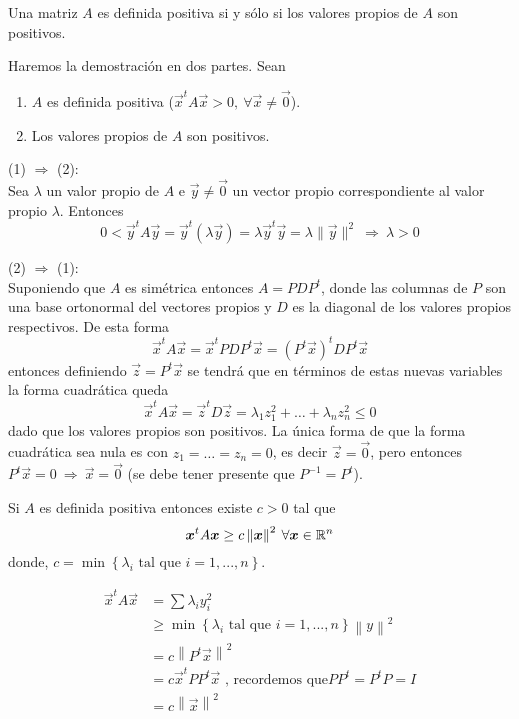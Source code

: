 \begin{teorema}
Una matriz $A$ es definida positiva si y s\'olo si los valores propios de $A$
son positivos.
\end{teorema}

\begin{demostracion}
Haremos la demostraci\'on en dos partes. Sean
\begin{enumerate}
\item $A$ es definida positiva ($\vec{x}^tA\vec{x} >0,\:\forall \vec{x}\neq \vec{0}$).
\item Los valores propios de $A$ son positivos.
\end{enumerate}

(1) $\Rightarrow$ (2):
\\Sea $\lambda$ un valor propio de $A$ e $\vec{y}\neq \vec{0}$ un vector propio correspondiente al valor propio $\lambda$. Entonces
$$0<\vec{y}^tA\vec{y}=\vec{y}^t(\lambda \vec{y})=\lambda \vec{y}^t\vec{y}=\lambda \|\vec{y}\|^2 \:\Rightarrow\: \lambda > 0$$

(2) $\Rightarrow$ (1):
\\Suponiendo que $A$ es sim\'etrica entonces $A=PDP^t$, donde las columnas de $P$ son una base ortonormal del vectores propios y $D$ es la diagonal de los valores propios respectivos. De esta forma
$$\vec{x}^tA\vec{x}=\vec{x}^tPDP^t\vec{x}=(P^t\vec{x})^tDP^t\vec{x}$$
entonces definiendo $\vec{z}=P^t\vec{x}$ se tendr\'a que en t\'erminos de estas nuevas variables la forma cuadr\'atica queda
$$\vec{x}^tA\vec{x}=\vec{z}^tD\vec{z}=\lambda_1z_1^2 + \ldots + \lambda_nz_n^2 \leq 0$$
dado que los valores propios son positivos. La \'unica forma de que la forma cuadr\'atica sea nula es con $z_1=\ldots=z_n=0$, es decir $\vec{z}=\vec{0}$, pero entonces $P^t\vec{x}=0 \:\Rightarrow\: \vec{x}=\vec{0}$ (se debe tener presente que $P^{-1}=P^t$).
\end{demostracion}

\begin{corolario}
Si $A$ es definida positiva entonces existe $c>0$ tal que
\[
\vec{x}^tA\vec{x}\geq c\left\|  \vec{x}\right\|  ^{2}\:\forall \vec{x}\in\R^{n}%
\]
donde, $c=\min\left\{  \lambda_i\text{ tal que } i=1,...,n\right\}  .$
\end{corolario}

\begin{demostracion}%
\begin{align*}
\vec{x}^tA\vec{x}  & =\sum\lambda_iy_i^{2} \\
& \geq\min\left\{\lambda_i\text{ tal que } i=1,...,n\right\}  \left\|  y\right\|^{2} \\
& =c\left\|P^t\vec{x}\right\|^{2} \\
& =c\vec{x}^tPP^t\vec{x}\text{ , recordemos que
}PP^t=P^tP=I \\
& =c\left\|\vec{x}\right\|^{2}%
\end{align*}
\end{demostracion}

